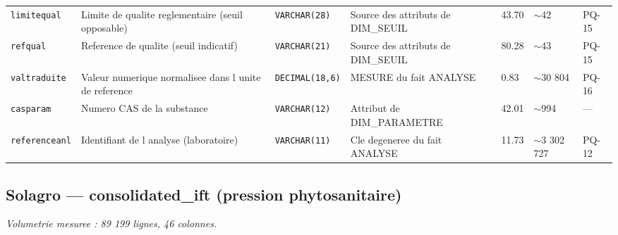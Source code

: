 {\begin{longtable}{@{}p{2.6cm}p{3.5cm}p{1.9cm}p{3.1cm}p{1.1cm}p{1.3cm}p{0.9cm}@{}}
\texttt{limitequal} & Limite de qualite reglementaire (seuil opposable) & \texttt{VARCHAR(28)} & Source des attributs de DIM\_SEUIL & 43.70 & $\sim$42 & PQ-15 \\
\texttt{refqual} & Reference de qualite (seuil indicatif) & \texttt{VARCHAR(21)} & Source des attributs de DIM\_SEUIL & 80.28 & $\sim$43 & PQ-15 \\
\texttt{valtraduite} & Valeur numerique normalisee dans l unite de reference & \texttt{DECIMAL(18,6)} & MESURE du fait ANALYSE & 0.83 & $\sim$30 804 & PQ-16 \\
\texttt{casparam} & Numero CAS de la substance & \texttt{VARCHAR(12)} & Attribut de DIM\_PARAMETRE & 42.01 & $\sim$994 & --- \\
\texttt{referenceanl} & Identifiant de l analyse (laboratoire) & \texttt{VARCHAR(11)} & Cle degeneree du fait ANALYSE & 11.73 & $\sim$3 302 727 & PQ-12 \\
\end{longtable}}

\subsection{Solagro --- consolidated\_ift (pression phytosanitaire)}
\noindent\textit{Volumetrie mesuree : 89 199 lignes, 46 colonnes.}\par\smallskip

